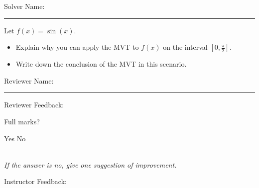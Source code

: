\documentclass[12pt]{exam}
\begin{document}
\pagestyle{headandfoot}
\firstpageheadrule

Solver Name:\enspace\rule{5cm}{0.8pt}

\begin{questions}
\question

Let $f(x) = \sin(x)$.
\begin{itemize}
\item Explain why you can apply the MVT to $f(x)$ on the interval $[0,\frac\pi2]$.
\item Write down the conclusion of the MVT in this scenario.
\end{itemize}

\end{questions}

Reviewer Name:\enspace\rule{5cm}{0.8pt}

\begin{questions}
\question
Reviewer Feedback:

Full marks? \begin{oneparcheckboxes}
\choice Yes
\choice No
\end{oneparcheckboxes}\\
\textit{If the answer is no, give one suggestion of improvement.}

\question

Instructor Feedback:



\end{questions}
\end{document}
